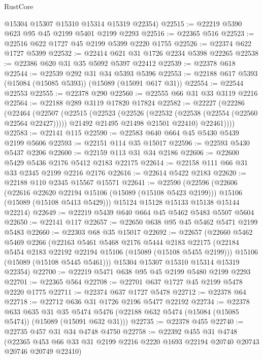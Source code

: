 \begin{lexlean}{RustCore}
\begin{coremodule}
      @15304
      @15307
      @15310
      @15314
      @15319
      @22354)
@22515 := @22219 @5390 @623 @95 @45 @2199 @5401 @2199 @2293
@22516 := @22365 @516
@22523 := @22516 @622 @1727 @45 @2199 @5399 @2220 @1755
@22526 := @22374 @622 @1727 @5399
@22532 := @22414 @621 @31 @1726 @2234 @5398 @22265
@22538 := @22386 @620 @31 @35 @5092 @5397 @22412
@22539 := @22378 @618
@22544 := @22539 @292 @31 @34 @5393 @5396
@22553 := @22188 @617 @5393 (@15084 (@15085 @5393)) (@15089 (@15091 @617 @31))
@22554 := @22544 @22553
@22555 := @22378 @290
@22560 := @22555 @66 @31 @33 @3119 @2216
@22564 := @22188 @289 @3119 @17820 @17824
@22582 := @22227
    (@22286
      (@22464
        (@22507
          (@22515
            (@22523
              (@22526 (@22532 (@22538 (@22554 (@22560 @22564 @22427)))))
              @21492
              @21495
              @21498
              @21501
              @22410)
            @22461))))
@22583 := @22141 @115
@22590 := @22583 @640 @664 @45 @5430 @5439 @2199 @5606
@22593 := @22151 @114 @35 @15017
@22596 := @22593 @5430 @5437 @2206
@22600 := @22159 @113 @31 @34 @2186
@22606 := @22600 @5429 @5436 @2176 @5412 @2183 @22175
@22614 := @22158 @111 @66 @31 @33 @2345 @2199 @2216 @2176
@22616 := @22614 @5422 @2183
@22620 := @22188 @110 @2345 @15567 @15571
@22641 := @22590
    (@22596
      (@22606
        (@22616 @22620 @22194 @15106 (@15089 (@15108 @5423 @2199)))
        @15106
        (@15089 (@15108 @5413 @5429)))
      @15124
      @15128
      @15133
      @15138
      @15144
      @22214)
@22649 := @22219 @5439 @640 @664 @45 @5462 @5483 @5507 @5604
@22650 := @22141 @117
@22657 := @22650 @638 @95 @45 @5462 @5471 @2199 @5483
@22660 := @22303 @68 @35 @15017
@22692 := @22657
    (@22660
      @5462
      @5469
      @2266
      (@22163
        @5461
        @5468
        @2176
        @5444
        @2183
        @22175
        (@22184 @5454 @2183 @22192 @22194 @15106 (@15089 (@15108 @5455 @2199)))
        @15106
        (@15089 (@15108 @5445 @5461)))
      @15304
      @15307
      @15310
      @15314
      @15319
      @22354)
@22700 := @22219 @5471 @638 @95 @45 @2199 @5480 @2199 @2293
@22701 := @22365 @564
@22708 := @22701 @637 @1727 @45 @2199 @5478 @2220 @1775
@22711 := @22374 @637 @1727 @5478
@22712 := @22378 @64
@22718 := @22712 @636 @31 @1726 @2196 @5477 @22192
@22734 := @22378
    @633
    @635
    @31
    @35
    @5474
    @5476
    (@22188 @632 @5474 (@15084 (@15085 @5474)) (@15089 (@15091 @632 @31)))
@22735 := @22378 @455
@22740 := @22735 @457 @31 @34 @4748 @4750
@22758 := @22392
    @455
    @31
    @4748
    (@22365 @453 @66 @33 @31 @2199 @2216 @2220 @1693 @22194 @20740 @20743 @20746 @20749 @22410)

\end{coremodule}
\end{lexlean}
